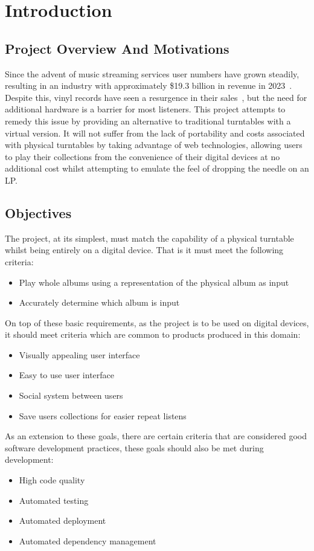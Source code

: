 \chapter{Introduction}\label{cha:intro}

\section{Project Overview And Motivations}
Since the advent of music streaming services user numbers have grown steadily, resulting in an industry with approximately \$19.3 billion in revenue in 2023~\cite{IFPI}. Despite this, vinyl records have seen a resurgence in their sales~\cite{BPI}, but the need for additional hardware is a barrier for most listeners.
This project attempts to remedy this issue by providing an alternative to traditional turntables with a virtual version. It will not suffer from the lack of portability and costs associated with physical turntables by taking advantage of web technologies, allowing users to play their collections from the convenience of their digital devices at no additional cost whilst attempting to emulate the feel of dropping the needle on an LP.

\section{Objectives}\label{sec:objectives}
The project, at its simplest, must match the capability of a physical turntable whilst being entirely on a digital device. That is it must meet the following criteria:
\begin{itemize}
    \item Play whole albums using a representation of the physical album as input
    \item Accurately determine which album is input
\end{itemize}
On top of these basic requirements, as the project is to be used on digital devices, it should meet criteria which are common to products produced in this domain:
\begin{itemize}
    \item Visually appealing user interface
    \item Easy to use user interface
    \item Social system between users
    \item Save users collections for easier repeat listens
\end{itemize}
As an extension to these goals, there are certain criteria that are considered good software development practices, these goals should also be met during development:
\begin{itemize}
    \item High code quality
    \item Automated testing
    \item Automated deployment
    \item Automated dependency management
\end{itemize}

